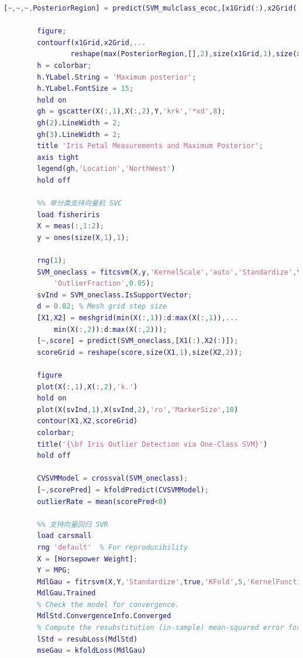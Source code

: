 \begin{lstlisting}[language=Matlab]
        [~,~,~,PosteriorRegion] = predict(SVM_mulclass_ecoc,[x1Grid(:),x2Grid(:)]);

        figure;
        contourf(x1Grid,x2Grid,...
                reshape(max(PosteriorRegion,[],2),size(x1Grid,1),size(x1Grid,2)));
        h = colorbar;
        h.YLabel.String = 'Maximum posterior';
        h.YLabel.FontSize = 15;
        hold on
        gh = gscatter(X(:,1),X(:,2),Y,'krk','*xd',8);
        gh(2).LineWidth = 2;
        gh(3).LineWidth = 2;
        title 'Iris Petal Measurements and Maximum Posterior';
        axis tight
        legend(gh,'Location','NorthWest')
        hold off

        %% 单分类支持向量机 SVC
        load fisheriris
        X = meas(:,1:2);
        y = ones(size(X,1),1);

        rng(1);
        SVM_oneclass = fitcsvm(X,y,'KernelScale','auto','Standardize',true,...
            'OutlierFraction',0.05);
        svInd = SVM_oneclass.IsSupportVector;
        d = 0.02; % Mesh grid step size
        [X1,X2] = meshgrid(min(X(:,1)):d:max(X(:,1)),...
            min(X(:,2)):d:max(X(:,2)));
        [~,score] = predict(SVM_oneclass,[X1(:),X2(:)]);
        scoreGrid = reshape(score,size(X1,1),size(X2,2));

        figure
        plot(X(:,1),X(:,2),'k.')
        hold on
        plot(X(svInd,1),X(svInd,2),'ro','MarkerSize',10)
        contour(X1,X2,scoreGrid)
        colorbar;
        title('{\bf Iris Outlier Detection via One-Class SVM}')
        hold off

        CVSVMModel = crossval(SVM_oneclass);
        [~,scorePred] = kfoldPredict(CVSVMModel);
        outlierRate = mean(scorePred<0)

        %% 支持向量回归 SVR
        load carsmall
        rng 'default'  % For reproducibility
        X = [Horsepower Weight];
        Y = MPG;
        MdlGau = fitrsvm(X,Y,'Standardize',true,'KFold',5,'KernelFunction','gaussian')
        MdlGau.Trained
        % Check the model for convergence.
        MdlStd.ConvergenceInfo.Converged
        % Compute the resubstitution (in-sample) mean-squared error for the new model.
        lStd = resubLoss(MdlStd)
        mseGau = kfoldLoss(MdlGau)
        \end{lstlisting}

